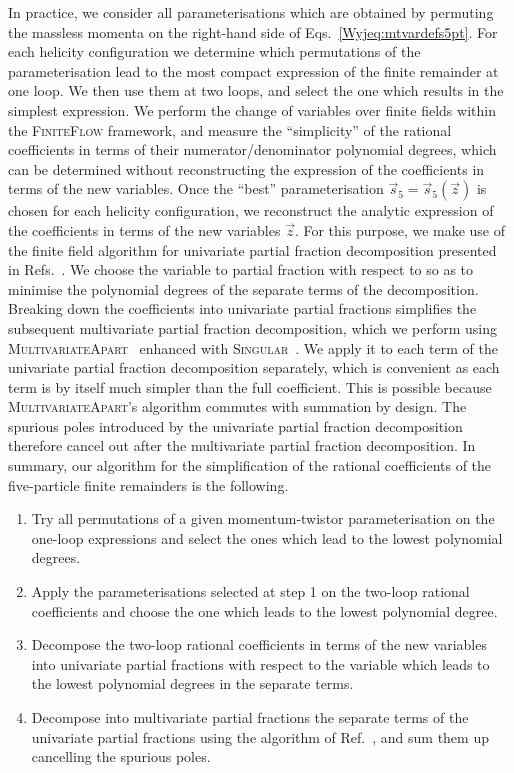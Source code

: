 \documentclass[main.tex]{subfiles}
\begin{document}
In practice, we consider all parameterisations which are obtained by permuting the massless momenta on the right-hand side of Eqs.~\eqref{Wyjeq:mtvardefs5pt}. For each helicity configuration we determine which permutations of the parameterisation lead to the most compact expression of the finite remainder at one loop. We then use them at two loops, and select the one which results in the simplest expression. We perform the change of variables over finite fields within the \textsc{FiniteFlow} framework, and measure the ``simplicity'' of the rational coefficients in terms of their numerator/denominator polynomial degrees, which can be determined without reconstructing the expression of the coefficients in terms of the new variables. Once the ``best'' parameterisation $\vec{s}_5 = \vec{s}_5 (\vec{z})$ is chosen for each helicity configuration, we reconstruct the analytic expression of the coefficients in terms of the new variables $\vec{z}$. For this purpose, we make use of the finite field algorithm for univariate partial fraction decomposition presented in Refs.~\cite{Badger:2021nhg,Badger:2021imn}. We choose the variable to partial fraction with respect to so as to minimise the polynomial degrees of the separate terms of the decomposition. Breaking down the coefficients into univariate partial fractions simplifies the subsequent multivariate partial fraction decomposition, which we perform using \textsc{MultivariateApart}~\cite{Heller:2021qkz} enhanced with \textsc{Singular}~\cite{DGPS}. We apply it to each term of the univariate partial fraction decomposition separately, which is convenient as each term is by itself much simpler than the full coefficient. This is possible because \textsc{MultivariateApart}'s algorithm commutes with summation by design. The spurious poles introduced by the univariate partial fraction decomposition therefore cancel out after the multivariate partial fraction decomposition. In summary, our algorithm for the simplification of the rational coefficients of the five-particle finite remainders is the following.
\begin{enumerate}
\item Try all permutations of a given momentum-twistor parameterisation on the one-loop expressions and select the ones which lead to the lowest polynomial degrees.
\item Apply the parameterisations selected at step 1 on the two-loop rational coefficients and choose the one which leads to the lowest polynomial degree.
\item Decompose the two-loop rational coefficients in terms of the new variables into univariate partial fractions with respect to the variable which leads to the lowest polynomial degrees in the separate terms.
\item Decompose into multivariate partial fractions the separate terms of the univariate partial fractions using the algorithm of Ref.~\cite{Heller:2021qkz}, and sum them up cancelling the spurious poles.
\end{enumerate}
\end{document}
